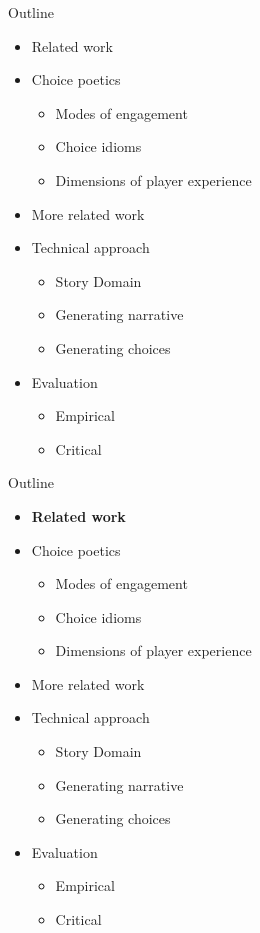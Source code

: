 \documentclass[xcolor=x11names]{beamer}
\begin{document}
\begin{frame}{Outline}
  \begin{itemize}
    \item Related work
    \item Choice poetics
    \begin{itemize}
      \item Modes of engagement
      \item Choice idioms
      \item Dimensions of player experience
    \end{itemize}
    \item More related work
    \item Technical approach
    \begin{itemize}
      \item Story Domain
      \item Generating narrative
      \item Generating choices
    \end{itemize}
    \item Evaluation
    \begin{itemize}
      \item Empirical
      \item Critical
    \end{itemize}
  \end{itemize}
\end{frame}

\begin{frame}{Outline}
  \begin{itemize}
    \item \textbf{Related work}
    \item Choice poetics
    \begin{itemize}
      \item Modes of engagement
      \item Choice idioms
      \item Dimensions of player experience
    \end{itemize}
    \item More related work
    \item Technical approach
    \begin{itemize}
      \item Story Domain
      \item Generating narrative
      \item Generating choices
    \end{itemize}
    \item Evaluation
    \begin{itemize}
      \item Empirical
      \item Critical
    \end{itemize}
  \end{itemize}
\end{frame}
\end{document}
